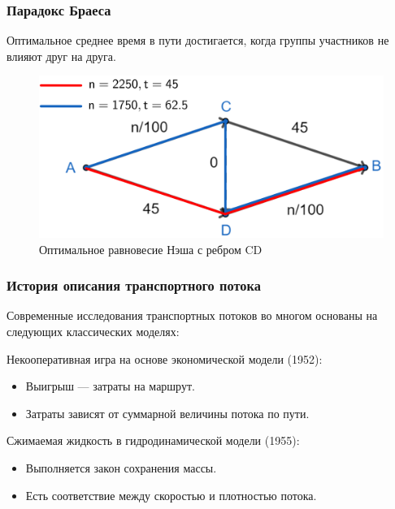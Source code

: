 \documentclass{beamer}
\begin{document}
\begin{frame}\frametitle{Парадокс Браеса}
	Оптимальное среднее время в пути достигается, когда группы участников не влияют друг на друга.
	\begin{figure}[H]
	\begin{center}
		\begin{minipage}[h]{0.60\linewidth}
			\includegraphics[width=1\linewidth]{imgs/braess_after_opt_short.png}
			\caption{Оптимальное равновесие Нэша с ребром CD}
			\label{ris:braess_3}
		\end{minipage}
	\end{center}
\end{figure}
\end{frame}

\begin{frame}\frametitle{История описания транспортного потока}
	Современные исследования транспортных потоков во многом основаны на следующих классических моделях:
	
	\bigskip
	
	Некооперативная игра на основе экономической модели (1952):
	\begin{itemize}
		\item Выигрыш --- затраты на маршрут.
		
		\item Затраты зависят от суммарной величины потока по пути. 
	\end{itemize}

	\bigskip

	Сжимаемая жидкость в гидродинамической модели (1955):
	\begin{itemize}
		\item Выполняется закон сохранения массы.
		
		\item Есть соответствие между скоростью и плотностью потока.
	\end{itemize}
\end{frame}
\end{document}
